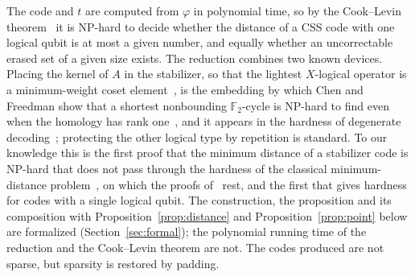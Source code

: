 \documentclass[11pt]{article}
\theoremstyle{remark}
\newcommand{\F}{\mathbb F_2}
\begin{document}
The code and \(t\) are computed from \(\varphi\) in polynomial time, so
by the Cook--Levin theorem~\cite{cook1971} it is NP-hard to decide
whether the distance of a CSS code with one logical qubit is at most a
given number, and equally whether an uncorrectable erased set of a
given size exists. The reduction combines two known devices. Placing
the kernel of \(A\) in the stabilizer, so that the lightest
\(X\)-logical operator is a minimum-weight coset
element~\cite{bmvt1978}, is the embedding by which Chen and Freedman
show that a shortest nonbounding \(\F\)-cycle is NP-hard to find even
when the homology has rank one~\cite{chenfreedman2011}, and it appears
in the hardness of degenerate decoding~\cite{iyerpoulin2015};
protecting the other logical type by repetition is standard. To our
knowledge this is the first proof that the minimum distance of a
stabilizer code is NP-hard that does not pass through the hardness of
the classical minimum-distance problem~\cite{vardy1997}, on which the
proofs of~\cite{kapshikarkundu2023,gjs2025} rest, and the first that
gives hardness for codes with a single logical qubit. The construction, the
proposition and its composition with Proposition~\ref{prop:distance}
and Proposition~\ref{prop:point} below are formalized
(Section~\ref{sec:formal}); the polynomial running time of the
reduction and the Cook--Levin theorem are not. The codes produced are
not sparse, but sparsity is restored by padding.
\end{document}

